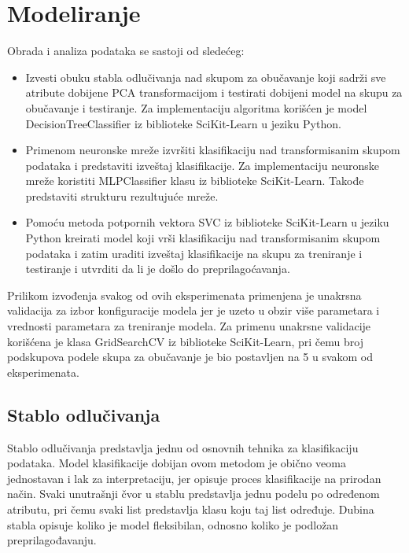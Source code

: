 \documentclass[12pt]{article}
\begin{document}
\section {Modeliranje}

Obrada i analiza podataka se sastoji od sledećeg:

\begin{itemize}

	\item Izvesti obuku stabla odlučivanja nad skupom za obučavanje koji sadrži sve atribute dobijene PCA transformacijom i testirati dobijeni model na skupu za obučavanje i testiranje. Za implementaciju algoritma korišćen je model DecisionTreeClassifier iz biblioteke SciKit-Learn u jeziku Python.
	\item Primenom neuronske mreže izvršiti klasifikaciju nad transformisanim skupom podataka i predstaviti izveštaj klasifikacije. Za implementaciju neuronske mreže koristiti MLPClassifier klasu iz biblioteke SciKit-Learn. Takođe predstaviti strukturu rezultujuće mreže.
	\item Pomoću metoda potpornih vektora SVC iz biblioteke SciKit-Learn u jeziku Python kreirati model koji vrši klasifikaciju nad transformisanim skupom podataka i zatim uraditi izveštaj klasifikacije na skupu za treniranje i testiranje i utvrditi da li je došlo do preprilagoćavanja.

\end{itemize}

Prilikom izvođenja svakog od ovih eksperimenata primenjena je unakrsna validacija za izbor konfiguracije modela jer je uzeto u obzir više parametara i vrednosti parametara za treniranje modela. Za primenu unakrsne validacije korišćena je klasa GridSearchCV iz biblioteke SciKit-Learn, pri čemu broj podskupova podele skupa za obučavanje je bio postavljen na 5 u svakom od eksperimenata.

\subsection {Stablo odlučivanja}
Stablo odlučivanja predstavlja jednu od osnovnih tehnika za klasifikaciju podataka. Model klasifikacije dobijan ovom metodom je obično veoma jednostavan i lak za interpretaciju, jer opisuje proces klasifikacije na prirodan način. Svaki unutrašnji čvor u stablu predstavlja jednu podelu po određenom atributu, pri čemu svaki list predstavlja klasu koju taj list određuje. Dubina stabla opisuje koliko je model fleksibilan, odnosno koliko je podložan preprilagođavanju.
\end{document}

